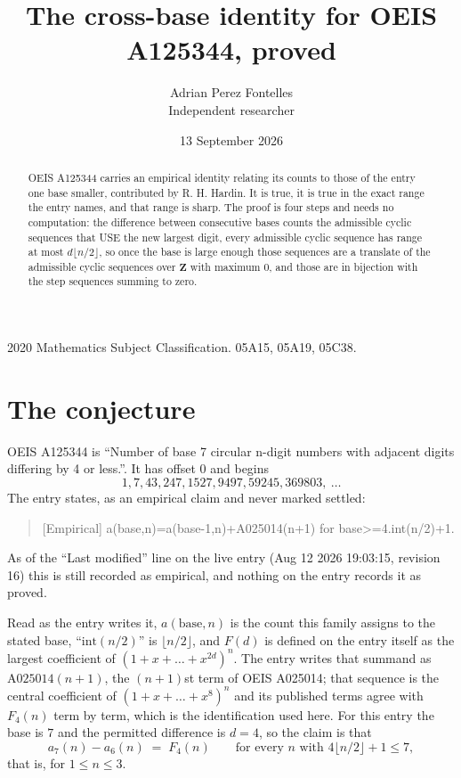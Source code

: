 \documentclass[11pt,a4paper]{article}
\title{The cross-base identity for OEIS A125344, proved}
\author{Adrian Perez Fontelles\\ \small Independent researcher}
\date{13 September 2026}
\theoremstyle{plain}
\theoremstyle{definition}
\begin{document}
\maketitle

\begin{abstract}
OEIS A125344 carries an empirical identity relating its counts to those of the entry one base
smaller, contributed by R. H. Hardin. It is true, it is true in the exact range the entry
names, and that range is sharp. The proof is four steps and needs no computation: the
difference between consecutive bases counts the admissible cyclic sequences that USE the new
largest digit, every admissible cyclic sequence has range at most $d\lfloor n/2\rfloor$, so
once the base is large enough those sequences are a translate of the admissible cyclic
sequences over $\mathbf{Z}$ with maximum $0$, and those are in bijection with the step
sequences summing to zero.
\end{abstract}

\noindent\small 2020 Mathematics Subject Classification. 05A15, 05A19, 05C38.\normalsize

\section{The conjecture}

OEIS A125344 is ``Number of base 7 circular n-digit numbers with adjacent digits differing by 4 or less.''. It has offset $0$ and begins
\[
1, 7, 43, 247, 1527, 9497, 59245, 369803,\ \dots
\]
The entry states, as an empirical claim and never marked settled:
\begin{quote}
[Empirical] a(base,n)=a(base-1,n)+A025014(n+1) for base>=4.int(n/2)+1.
\end{quote}
As of the ``Last modified'' line on the live entry (Aug 12 2026 19:03:15, revision 16)
this is still recorded as empirical, and nothing on the entry records it as proved.

Read as the entry writes it, $a(\mathrm{base},n)$ is the count this family assigns to the
stated base, ``$\mathrm{int}(n/2)$'' is $\lfloor n/2\rfloor$, and $F(d)$ is defined on the
entry itself as the largest coefficient of $(1+x+\dots+x^{2d})^{n}$. The entry writes that summand as $\mathrm{A025014}(n+1)$, the $(n+1)$st term of OEIS A025014; that sequence is the central coefficient of $(1+x+\dots+x^{8})^{n}$ and its published terms agree with $F_{4}(n)$ term by term, which is the identification used here. For this entry
the base is $7$ and the permitted difference is $d=4$, so the claim is that
\[
a_{7}(n)-a_{6}(n)\;=\;F_{4}(n)
\qquad\text{for every } n \text{ with } 4\lfloor n/2\rfloor+1\le7,
\]
that is, for $1\le n\le3$.
\end{document}
